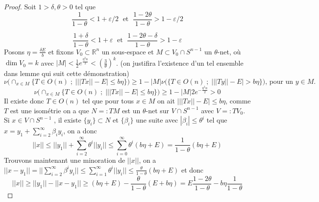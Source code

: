 \documentclass{report}
\begin{document}
\begin{proof}
	Soit $1>\delta,\theta>0$ tel que
	\begin{equation*}
		\frac{1}{1-\theta}<1+\varepsilon/2 \; \text{ et }\; \frac{1-2\theta}{1-\theta}>1-\varepsilon/2
	\end{equation*}
	
	\begin{equation*}
		\frac{1+\delta}{1-\theta}<1+\varepsilon \; \text{ et } \; \frac{1-2\theta -\delta}{1-\theta}>1-\varepsilon
	\end{equation*}
	Posons $\eta = \frac{\delta E}{b}$ et fixons $V_0\subset \mathbb{R}^n$ un sous-espace et $M\subset V_0\cap S^{n-1}$ un $\theta$-net, où $\dim V_0 = k$ \color{red}avec $|M|< \frac{1}{2}e^{\frac{\eta^2n}{2}}< (\frac{3}{\theta})^k$. \color{black} (on justifira l'existence d'un tel ensemble dans lemme qui suit cette démonstration)
	\begin{equation*}
		\nu\Big(\cap_{x\in M}\big\{T\in O(n)\; ; \;  \big| ||Tx||-E \big|\leq b\eta\big\}\Big)\geq 1-|M|\nu\Big(\big\{T\in O(n)\; ; \; \big| ||Ty||-E \big|>b\eta\big\}\Big) \text{,  pour un $y\in M$.}
	\end{equation*} 
	\begin{equation*}
		\nu\Big(\cap_{x\in M}\big\{T\in O(n)\; ; \;  \big| ||Tx||-E \big|\leq b\eta\big\}\Big)\geq 1-|M|2 e^{-\frac{\eta^2 n}{2}}>0
	\end{equation*} 
	Il existe donc $T\in O(n)$ tel que pour tous $x\in M$ on ait $\big|||Tx||-E \big|\leq b \eta$, comme $T$ est une isométrie on a que $N=: TM$ est un $\theta$-net sur $V\cap S^{n-1}$ avec $V=:TV_0$.\\
	Si $x\in V\cap S^{n-1}$ , \color{red}il existe $\{y_i\}\subset N$ et $\{\beta_i\}$ une suite avec $|\beta_i|\leq \theta^i $  tel que $x = y_1 + \sum_{i=2}^{\infty} \beta_i y_i$,
	\color{black} 
	on a donc 
	\begin{equation*}
		||x||\leq ||y_1|| + \sum_{i=2}^{\infty} \theta ^{i} ||y_i||\leq \sum_{i=0}^{\infty}\theta^i (b\eta+E)=\frac{1}{1-\theta}(b\eta + E)
	\end{equation*}
	Trouvons maintenant une minoration de $||x||$, on a $||x-y_1||=\Big|\Big|\sum_{i=2}^{\infty}\beta^i y_i \Big|\Big|\leq \sum_{i=1}^{\infty}\theta^i || y_i|| \leq \frac{\theta}{1-\theta}(b\eta + E)$
	et donc 
	\begin{equation*}
		||x||\geq ||y_1|| - ||x-y_1|| \geq (b\eta + E) - \frac{\theta}{1-\theta}(E+b\eta)=E\frac{1-2\theta}{1-\theta}-b\eta\frac{1}{1-\theta}
	\end{equation*}

\end{proof}
\end{document}
